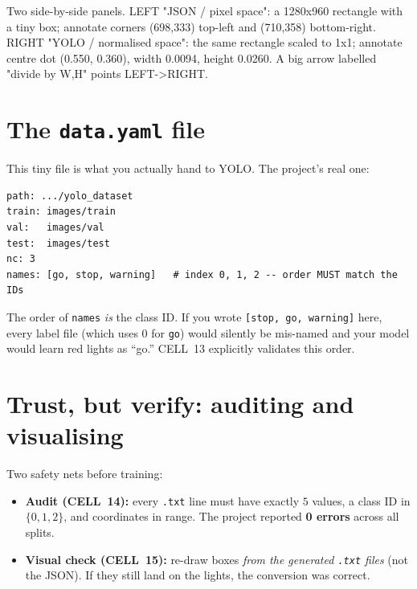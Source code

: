 \begin{diagramprompt}
Two side-by-side panels. LEFT "JSON / pixel space": a 1280x960 rectangle
with a tiny box; annotate corners (698,333) top-left and (710,358)
bottom-right. RIGHT "YOLO / normalised space": the same rectangle scaled
to 1x1; annotate centre dot (0.550, 0.360), width 0.0094, height 0.0260.
A big arrow labelled "divide by W,H" points LEFT->RIGHT.
\end{diagramprompt}

\section{The \texttt{data.yaml} file}
This tiny file is what you actually hand to YOLO. The project's real one:
\begin{verbatim}
path: .../yolo_dataset
train: images/train
val:   images/val
test:  images/test
nc: 3
names: [go, stop, warning]   # index 0, 1, 2 -- order MUST match the IDs
\end{verbatim}

\begin{warningbox}
The order of \texttt{names} \emph{is} the class ID. If you wrote
\texttt{[stop, go, warning]} here, every label file (which uses $0$ for
\texttt{go}) would silently be mis-named and your model would learn red
lights as ``go.'' CELL~13 explicitly validates this order.
\end{warningbox}

\section{Trust, but verify: auditing and visualising}
Two safety nets before training:
\begin{itemize}
  \item \textbf{Audit (CELL~14):} every \texttt{.txt} line must have
        exactly $5$ values, a class ID in $\{0,1,2\}$, and coordinates in
        range. The project reported \textbf{0 errors} across all splits.
  \item \textbf{Visual check (CELL~15):} re-draw boxes \emph{from the
        generated \texttt{.txt} files} (not the JSON). If they still land
        on the lights, the conversion was correct.
\end{itemize}


